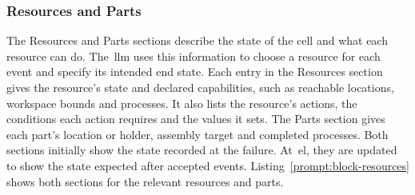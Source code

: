 \subsubsection{Resources and Parts}\label{sec:block-resources}

The Resources and Parts sections describe the state of the cell and what each resource can do.
The~\gls{llm} uses this information to choose a resource for each event and specify its intended end
state. Each entry in the Resources section gives the resource's state and declared capabilities, such as
reachable locations, workspace bounds and processes. It also lists the resource's actions, the
conditions each action requires and the values it sets. The Parts section gives each part's location or holder,
assembly target and completed processes. Both sections initially show the state recorded at the
failure. At~\gls{el}, they are updated to show the state expected after accepted events.
Listing~\ref{prompt:block-resources} shows both sections for the relevant resources and parts.


